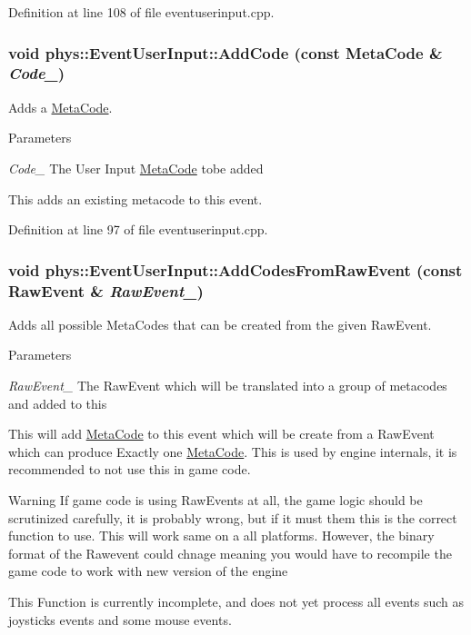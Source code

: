 Definition at line 108 of file eventuserinput.cpp.

\hypertarget{classphys_1_1EventUserInput_a648f820aea2b6bca23eaa3c1e1f54181}{
\subsubsection[{AddCode}]{\setlength{\rightskip}{0pt plus 5cm}void phys::EventUserInput::AddCode (const {\bf MetaCode} \& {\em Code\_\-})}}
\label{d7/df5/classphys_1_1EventUserInput_a648f820aea2b6bca23eaa3c1e1f54181}


Adds a \hyperlink{classphys_1_1MetaCode}{MetaCode}. 


\begin{DoxyParams}{Parameters}
\item[{\em Code\_\-}]The User Input \hyperlink{classphys_1_1MetaCode}{MetaCode} tobe added\end{DoxyParams}
This adds an existing metacode to this event. 

Definition at line 97 of file eventuserinput.cpp.

\hypertarget{classphys_1_1EventUserInput_a26a39a23deab9e54c140cc0a1cbbe6a9}{
\subsubsection[{AddCodesFromRawEvent}]{\setlength{\rightskip}{0pt plus 5cm}void phys::EventUserInput::AddCodesFromRawEvent (const {\bf RawEvent} \& {\em RawEvent\_\-})}}
\label{d7/df5/classphys_1_1EventUserInput_a26a39a23deab9e54c140cc0a1cbbe6a9}


Adds all possible MetaCodes that can be created from the given RawEvent. 


\begin{DoxyParams}{Parameters}
\item[{\em RawEvent\_\-}]The RawEvent which will be translated into a group of metacodes and added to this\end{DoxyParams}
This will add \hyperlink{classphys_1_1MetaCode}{MetaCode} to this event which will be create from a RawEvent which can produce Exactly one \hyperlink{classphys_1_1MetaCode}{MetaCode}. This is used by engine internals, it is recommended to not use this in game code. \begin{DoxyWarning}{Warning}
If game code is using RawEvents at all, the game logic should be scrutinized carefully, it is probably wrong, but if it must them this is the correct function to use. This will work same on a all platforms. However, the binary format of the Rawevent could chnage meaning you would have to recompile the game code to work with new version of the engine \par
 This Function is currently incomplete, and does not yet process all events such as joysticks events and some mouse events. 
\end{DoxyWarning}


